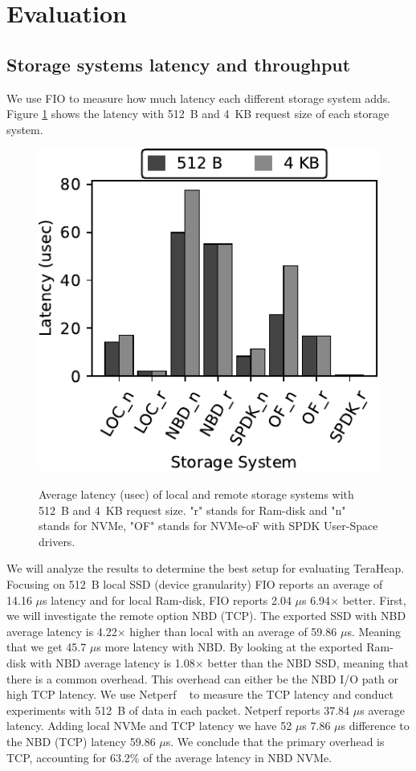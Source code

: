 \section{Evaluation}
\subsection{Storage systems latency and throughput}
We use FIO to measure how much latency each different storage system adds.
Figure \ref{fig:fio_512} shows the latency with \SI{512}{B} and \SI{4}{KB} request size
of each storage system.

\begin{figure}[H]
  \includegraphics[width=\linewidth]{figures/fio_lat.pdf}\\
\caption{Average latency (usec) of local and remote storage systems with \SI{512}{B} and \SI{4}{KB} request size. "r" stands for Ram-disk and "n" stands for NVMe, "OF" stands for NVMe-oF with SPDK User-Space drivers.}
\label{fig:fio_512}
\end{figure}

We will analyze the results to determine the best setup for evaluating TeraHeap. Focusing on \SI{512}{B} local SSD (device granularity) FIO reports an average of 14.16 $\mu$s latency and for local Ram-disk, FIO reports 2.04 $\mu$s 6.94$\times$ better. First, we will investigate the remote option NBD (TCP). The exported SSD with NBD average latency is 4.22$\times$ higher than local with an average of 59.86 $\mu$s. Meaning that we get 45.7 $\mu$s more latency with NBD. By looking at the exported Ram-disk with NBD average latency is 1.08$\times$ better than the NBD SSD, meaning that there is a common overhead. This overhead can either be the NBD I/O path or high TCP latency. We use Netperf ~\cite{netperf} to measure the TCP latency and conduct experiments with \SI{512}{B} of data in each packet. Netperf reports 37.84 $\mu$s average
latency. Adding local NVMe and TCP latency we have 52 $\mu$s 7.86 $\mu$s difference to the NBD
(TCP) latency 59.86 $\mu$s. We conclude that the primary overhead is TCP, accounting for 63.2\% of the average latency in NBD NVMe.

